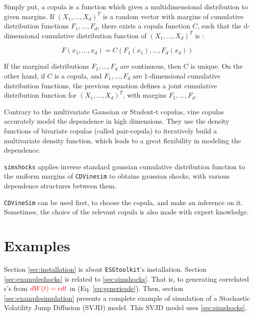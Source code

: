 \documentclass[a4paper]{article}\usepackage[]{graphicx}\usepackage[]{color}
\newcommand{\code}[1]{\mbox{\texttt{#1}}}
\begin{document}
\medskip

Simply put, a copula is a function which gives a multidimensional distribution to given margins. If $(X_1, \ldots, X_d)^T$ is a random vector with margins of cumulative distribution functions $F_1, \ldots, F_d$, there exists a copula  function $C$, such that the d-dimensional cumulative distribution function of $(X_1, \ldots, X_d)^T$ is :

\begin{equation}
F(x_1, \ldots, x_d) = C(F_1(x_1), \ldots, F_d(x_d))
\end{equation}


If the marginal distributions $F_1, \ldots, F_d$ are continuous, then $C$ is unique. On the other hand, if $C$ is a copula, and $F_1, \ldots, F_d$ are 1-dimensional cumulative distribution functions, the previous equation defines a joint cumulative distribution function for $(X_1, \ldots, X_d)^T$, with margins $F_1, \ldots, F_d$.

\medskip

Contrary to the multivariate Gaussian or Student-t copulas, vine copulas accurately model the dependence in high dimensions. They use the density functions of bivariate copulas (called pair-copula) to iteratively build a multivariate density function, which leads to a great flexibility in modeling the dependence.  

\medskip

\code{simshocks} applies inverse standard gaussian cumulative distribution function to the uniform margins of \code{CDVinesim} to obtains gaussian shocks, with various dependence structures between them. 

\medskip

\code{CDVineSim} can be used first, to choose the copula, and make an inference on it. Sometimes, the choice of the relevant copula is also made with expert knowledge. 

\medskip

\section{Examples}
\label{sec:examples}

Section \ref{sec:installation} is about \code{ESGtoolkit}'s installation. Section \ref{sec:exampleshocks} is related to \ref{sec:simshocks}. That is, to generating  correlated $\epsilon$'s from  $\textcolor{red}{dW(t) = \epsilon dt}$ in (Eq. \ref{eq:genericsde}). Then, section \ref{sec:examplesimulation} presents a complete example of simulation of  a Stochastic Volatility Jump Diffusion (SVJD) model. This SVJD model uses \ref{sec:simshocks}.
\end{document}
